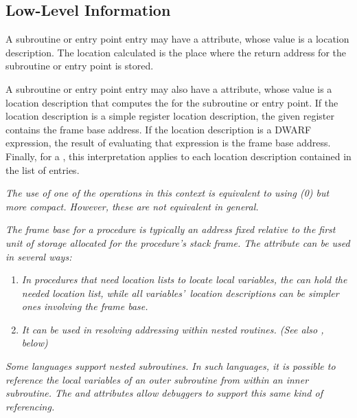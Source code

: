 \subsection{Low-Level Information}
\label{chap:lowlevelinformation}

A 
\hypertarget{chap:DWATreturnaddrsubroutinereturnaddresssavelocation}{}
subroutine or entry point entry may have 
a 
\DWATreturnaddr{}
attribute, whose value is a location description. The location
calculated is the place where the return address for the
subroutine or entry point is stored.

A 
\hypertarget{chap:DWATframebasesubroutineframebaseaddress}{}
subroutine or entry point entry may also have 
a
\DWATframebase{} attribute, whose value is a location
description that computes the  for the
subroutine or entry point. If the location description is
a simple register location description, the given register
contains the frame base address. If the location description is
a DWARF expression, the result of evaluating that expression
is the frame base address. Finally, for a 
,
this interpretation applies to each location description
contained in the list of  entries.

\textit{The use of one of the \DWOPregn{} 
operations in this
context is equivalent to using 
\DWOPbregn(0) 
but more
compact. However, these are not equivalent in general.}

\textit{The frame base for a procedure is typically an address fixed
relative to the first unit of storage allocated for the
procedure\textquoteright s stack frame. The \DWATframebase{} attribute
can be used in several ways:}
\begin{enumerate}[1. ]
\item \textit{In procedures that need 
location lists to locate local
variables, the \DWATframebase{} can hold the needed location
list, while all variables\textquoteright\  location descriptions can be
simpler ones involving the frame base.}

\item \textit{It can be used in resolving  addressing
within nested routines. 
(See also \DWATstaticlink, below)}
\end{enumerate}

\textit{Some languages support nested subroutines. In such languages,
it is possible to reference the local variables of an
outer subroutine from within an inner subroutine. The
\DWATstaticlink{} and \DWATframebase{} attributes allow
debuggers to support this same kind of referencing.}

